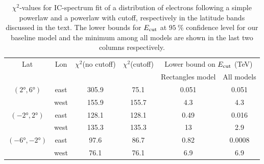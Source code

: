 %

\begin{table}
  \begin{center}
    \caption{$\chi^2$-values for IC-spectrum fit of a distribution of electrons following a simple powerlaw and a powerlaw with cutoff, respectively in the latitude bands discussed in the text. 
The lower bounds for $E_{\text{cut}}$ at $\SI{95}{\percent}$ confidence level for our baseline model and the minimum among all
models are shown in the last two columns respectively.
}
    \label{tab:IC}
    \begin{tabular}{|c|c|c|c|c|c|} %
     	\hline
		 Lat & Lon  & $\chi^2$(no cutoff) &  $\chi^2$(cutoff) & \multicolumn{2}{c|}{Lower bound on $E_{\text{cut}}$ (TeV) } \\ 
		       &         &                               &                            &  \multicolumn{1}{c}{Rectangles model} & All models \\ 
		\hline
  		$(\ang{2}, \ang{6})$ & east & 305.9 & 75.1  & 0.051 & 0.051 \\ 
		& west & 155.9 & 155.7  & 4.3  & 4.3 \\ 
 		\hline
  		$(\ang{-2}, \ang{2})$ & east & 128.1 & 128.1 & 0.49 & 0.016 \\ 
		& west & 135.3 & 135.3 & 13  & 2.9  \\ 
 		\hline
  		$(\ang{-6}, \ang{-2})$ & east & 97.6 & 86.7 & 0.82 & 0.0008 \\ 
		& west & 76.1 & 76.1 & 6.9 & 6.9\\ 
 \hline
    \end{tabular}
  \end{center}
\end{table}




